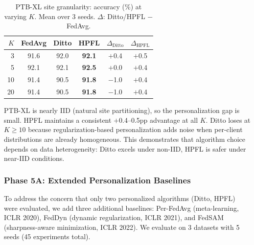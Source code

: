 \documentclass[conference]{IEEEtran}
\begin{document}
\begin{table}[htbp]
\centering
\caption{PTB-XL site granularity: accuracy (\%) at varying $K$. Mean over 3 seeds. $\Delta$: Ditto/HPFL $-$ FedAvg.}
\label{tab:ptbxl_granularity}
\small
\begin{tabular}{rccc|cc}
\toprule
$K$ & FedAvg & Ditto & HPFL & $\Delta_{\text{Ditto}}$ & $\Delta_{\text{HPFL}}$ \\
\midrule
3 & 91.6 & 92.0 & \textbf{92.1} & $+$0.4 & $+$0.5 \\
5 & 92.1 & 92.1 & \textbf{92.5} & $+$0.0 & $+$0.4 \\
10 & 91.4 & 90.5 & \textbf{91.8} & $-$1.0 & $+$0.4 \\
20 & 91.4 & 90.5 & \textbf{91.8} & $-$1.0 & $+$0.4 \\
\bottomrule
\end{tabular}
\par{\footnotesize PTB-XL is nearly IID (natural site partitioning), so the personalization gap is small. HPFL maintains a consistent $+$0.4--0.5pp advantage at all $K$. Ditto loses at $K{\geq}10$ because regularization-based personalization adds noise when per-client distributions are already homogeneous. This demonstrates that algorithm choice depends on data heterogeneity: Ditto excels under non-IID, HPFL is safer under near-IID conditions.}
\end{table}

\subsubsection{Phase 5A: Extended Personalization Baselines}
\label{sec:phase5a}

To address the concern that only two personalized algorithms (Ditto, HPFL) were evaluated, we add three additional baselines: Per-FedAvg (meta-learning, ICLR 2020), FedDyn (dynamic regularization, ICLR 2021), and FedSAM (sharpness-aware minimization, ICLR 2022). We evaluate on 3 datasets with 5 seeds (45 experiments total).
\end{document}
